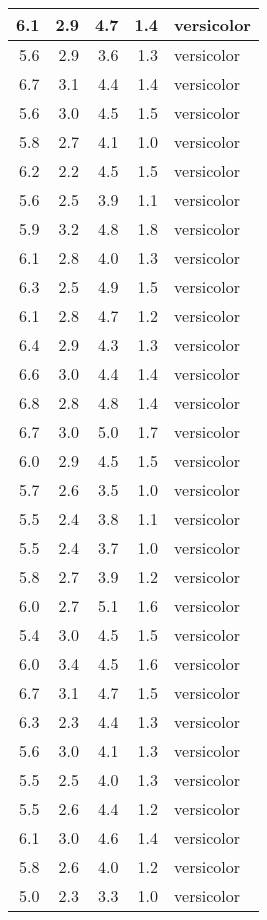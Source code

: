 \begin{tabular}{r|r|r|r|l}
\hline
6.1 & 2.9 & 4.7 & 1.4 & versicolor\\
\hline
5.6 & 2.9 & 3.6 & 1.3 & versicolor\\
\hline
6.7 & 3.1 & 4.4 & 1.4 & versicolor\\
\hline
5.6 & 3.0 & 4.5 & 1.5 & versicolor\\
\hline
5.8 & 2.7 & 4.1 & 1.0 & versicolor\\
\hline
6.2 & 2.2 & 4.5 & 1.5 & versicolor\\
\hline
5.6 & 2.5 & 3.9 & 1.1 & versicolor\\
\hline
5.9 & 3.2 & 4.8 & 1.8 & versicolor\\
\hline
6.1 & 2.8 & 4.0 & 1.3 & versicolor\\
\hline
6.3 & 2.5 & 4.9 & 1.5 & versicolor\\
\hline
6.1 & 2.8 & 4.7 & 1.2 & versicolor\\
\hline
6.4 & 2.9 & 4.3 & 1.3 & versicolor\\
\hline
6.6 & 3.0 & 4.4 & 1.4 & versicolor\\
\hline
6.8 & 2.8 & 4.8 & 1.4 & versicolor\\
\hline
6.7 & 3.0 & 5.0 & 1.7 & versicolor\\
\hline
6.0 & 2.9 & 4.5 & 1.5 & versicolor\\
\hline
5.7 & 2.6 & 3.5 & 1.0 & versicolor\\
\hline
5.5 & 2.4 & 3.8 & 1.1 & versicolor\\
\hline
5.5 & 2.4 & 3.7 & 1.0 & versicolor\\
\hline
5.8 & 2.7 & 3.9 & 1.2 & versicolor\\
\hline
6.0 & 2.7 & 5.1 & 1.6 & versicolor\\
\hline
5.4 & 3.0 & 4.5 & 1.5 & versicolor\\
\hline
6.0 & 3.4 & 4.5 & 1.6 & versicolor\\
\hline
6.7 & 3.1 & 4.7 & 1.5 & versicolor\\
\hline
6.3 & 2.3 & 4.4 & 1.3 & versicolor\\
\hline
5.6 & 3.0 & 4.1 & 1.3 & versicolor\\
\hline
5.5 & 2.5 & 4.0 & 1.3 & versicolor\\
\hline
5.5 & 2.6 & 4.4 & 1.2 & versicolor\\
\hline
6.1 & 3.0 & 4.6 & 1.4 & versicolor\\
\hline
5.8 & 2.6 & 4.0 & 1.2 & versicolor\\
\hline
5.0 & 2.3 & 3.3 & 1.0 & versicolor\\

\end{tabular}
